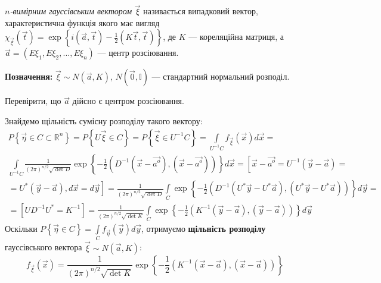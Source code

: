 \begin{definition}
    $n$\emph{-вимірним гауссівським вектором} $\vec{\xi}$ називається випадковий вектор,
    характеристична функція якого має вигляд $\chi_{\vec{\xi}}(\vec{t}) = \exp\left\{i(\vec{a}, \vec{t}) - \frac{1}{2}(K\vec{t}, \vec{t})\right\}$,
    де $K$ --- кореляційна матриця, а $\vec{a} = \left( E\xi_1, E\xi_2, ..., E\xi_n\right)$ --- центр розсіювання.
\end{definition}
\noindent \textbf{Позначення:} $\vec{\xi} \sim {N}( \vec{a}, K)$, ${N}( \vec{0}, \mathbb{I})$ --- стандартний нормальний розподіл.
\begin{exercise}
    Перевірити, що $\vec{a}$ дійсно є центром розсіювання.
\end{exercise}
Знайдемо щільність сумісну розподілу такого вектору:
\begin{gather*}
    P\left\{\vec{\eta} \in C \subset \mathbb{R}^n\right\} = P\left\{U\vec{\xi}\in C\right\} = 
    P\left\{\vec{\xi}\in U^{-1}C\right\} = 
    \int\limits_{U^{-1}C} f_{\vec{\xi}}(\vec{x}) d\vec{x} = \\
    \int\limits_{U^{-1}C} \frac{1}{(2\pi)^{n/2} \sqrt{{\det{D}}}} \exp \left\{ -\frac{1}{2} \left( D^{-1}(\vec{x} - \vec{a^o}), (\vec{x} - \vec{a^o})\right)\right\} d\vec{x} =
    \left[ \vec{x} - \vec{a^o} = U^{-1}(\vec{y} - \vec{a}) = \right. \\ \left. = U^{*}(\vec{y} - \vec{a}), d\vec{x} = d\vec{y}\right] = 
    \frac{1}{(2\pi)^{n/2} \sqrt{{\det{D}}}} \int\limits_{C} \exp \left\{ -\frac{1}{2} \left( D^{-1}(U^{*}\vec{y} - U^{*}\vec{a}), (U^{*}\vec{y} - U^{*}\vec{a})\right)\right\} d\vec{y} = \\
    = \left[ UD^{-1}U^{*} = K^{-1}\right] =
    \frac{1}{(2\pi)^{n/2} \sqrt{{\det{K}}}} \int\limits_{C} \exp \left\{ -\frac{1}{2} \left( K^{-1}(\vec{y} - \vec{a}), (\vec{y} - \vec{a})\right)\right\} d\vec{y}
\end{gather*}
Оскільки $P\left\{\vec{\eta} \in C\right\} = \int\limits_{C} f_{\vec{\eta}}(\vec{y}) d\vec{y}$,
отримуємо \textbf{щільність розподілу} гауссівського вектора $\vec{\xi} \sim {N}(\vec{a}, K)$:
\begin{equation}
    f_{\vec{\xi}}(\vec{x}) = \frac{1}{(2\pi)^{n/2} \sqrt{{\det{K}}}} \exp \left\{ -\frac{1}{2} \left( K^{-1}(\vec{x} - \vec{a}), (\vec{x} - \vec{a})\right)\right\}
\end{equation}
